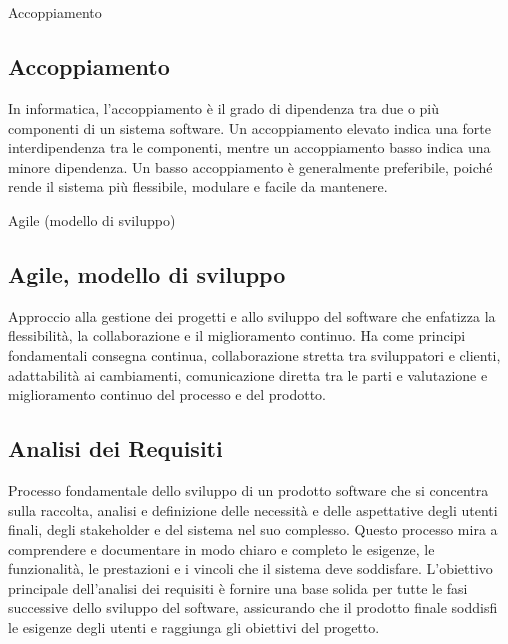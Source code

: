\appendix %



\section{}

\hypertarget{sec:accoppiamento}{Accoppiamento}
\subsection*{Accoppiamento}
In informatica, l'accoppiamento è il grado di dipendenza tra due o più componenti di un sistema software. Un accoppiamento elevato indica una forte
interdipendenza tra le componenti, mentre un accoppiamento basso indica una minore dipendenza. Un basso accoppiamento è generalmente preferibile, poiché
rende il sistema più flessibile, modulare e facile da mantenere.

\hypertarget{sec:modello_agile}{Agile (modello di sviluppo)}
\subsection*{Agile, modello di sviluppo}
Approccio alla gestione dei progetti e allo sviluppo del software che enfatizza la flessibilità, la collaborazione e il miglioramento continuo. 
Ha come principi fondamentali consegna continua, collaborazione stretta tra sviluppatori e clienti, adattabilità ai cambiamenti, 
comunicazione diretta tra le parti e valutazione e miglioramento continuo del processo e del prodotto.

\subsection*{Analisi dei Requisiti}
Processo fondamentale dello sviluppo di un prodotto software che si concentra sulla raccolta, analisi e definizione delle necessità e delle aspettative 
degli utenti finali, degli stakeholder e del sistema nel suo complesso. Questo processo mira a comprendere e documentare in modo chiaro e completo le 
esigenze, le funzionalità, le prestazioni e i vincoli che il sistema deve soddisfare. L’obiettivo principale dell’analisi dei requisiti è fornire una 
base solida per tutte le fasi successive dello sviluppo del software, assicurando che il prodotto finale soddisfi le esigenze degli utenti e raggiunga 
gli obiettivi del progetto.

